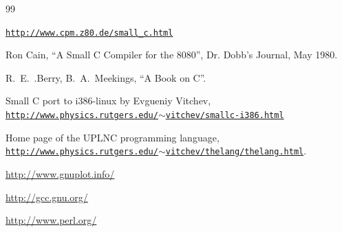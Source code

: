 \documentclass[10pt]{article}
\begin{document}
\begin{thebibliography}{99}

\href{http://www.cpm.z80.de/small_c.html}
{\texttt{http://www.cpm.z80.de/small\_{}c.html}}

 Ron Cain, ``A Small C Compiler for the 8080'',
  Dr. Dobb's Journal, May 1980.

R.~E.~.Berry, B.~A.~Meekings, ``A Book on C''.

 Small C port to i386-linux by Evgueniy Vitchev, \\
\href{http://www.physics.rutgers.edu/~vitchev/smallc-i386.html}
{\texttt{http://www.physics.rutgers.edu/$\sim$vitchev/smallc-i386.html}}

 Home page of the UPLNC programming language,\\
\href{http://www.physics.rutgers.edu/~vitchev/thelang/thelang.html}
{\texttt{http://www.physics.rutgers.edu/$\sim$vitchev/thelang/thelang.html}}.

\href{http://www.gnuplot.info/}{http://www.gnuplot.info/}

\href{http://gcc.gnu.org/}{http://gcc.gnu.org/}

\href{http://www.perl.org/}{http://www.perl.org/}

\end{thebibliography}
\end{document}
